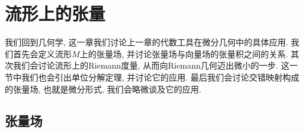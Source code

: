 \chapter{流形上的张量}
我们回到几何学, 这一章我们讨论上一章的代数工具在微分几何中的具体应用.
我们首先会定义流形$M$上的张量场, 并讨论张量场与向量场的张量积之间的关系.
其次我们会讨论流形上的Riemann度量, 从而向Riemann几何迈出微小的一步.
这一节中我们也会引出单位分解定理, 并讨论它的应用.
最后我们会讨论交错映射构成的张量场, 也就是微分形式, 我们会略微谈及它的应用.

\section{张量场}